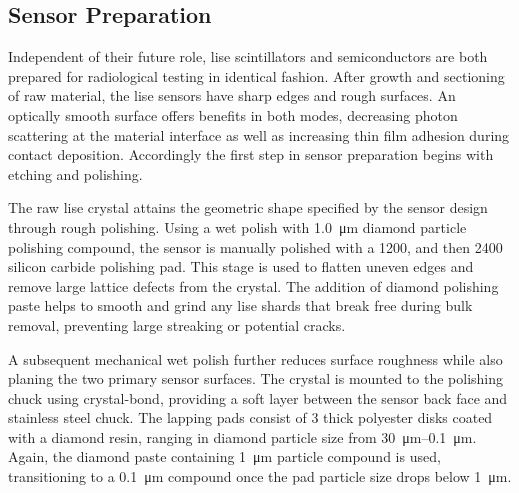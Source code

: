 \documentclass[../../../main.tex]{subfiles}
\begin{document}
%
    \subsection{Sensor Preparation}%
    \label{sec:chapter-3:sensor-fabrication:sensor-preparation}%
    Independent of their future role, \gls{lise} scintillators and semiconductors are both prepared for radiological testing in identical fashion.
    After growth and sectioning of raw material, the \gls{lise} sensors have sharp edges and rough surfaces.
    An optically smooth surface offers benefits in both modes, decreasing photon scattering at the material interface as well as increasing thin film adhesion during contact deposition.
    Accordingly the first step in sensor preparation begins with etching and polishing.
    \par%
    The raw \gls{lise} crystal attains the geometric shape specified by the sensor design through rough polishing.
    Using a wet polish with \SI{1.0}{\micro\meter} diamond particle polishing compound, the sensor is manually polished with a \SI{1200}{\grit}, and then \SI{2400}{\grit} silicon carbide polishing pad.
    This stage is used to flatten uneven edges and remove large lattice defects from the crystal.
    The addition of diamond polishing paste helps to smooth and grind any \gls{lise} shards that break free during bulk removal, preventing large streaking or potential cracks.
    \par%
    A subsequent mechanical wet polish further reduces surface roughness while also planing the two primary sensor surfaces.
    The crystal is mounted to the polishing chuck using \gls{crystal-bond}, providing a soft layer between the sensor back face and stainless steel chuck.
    The lapping pads consist of \SI{3}{\mil} thick polyester disks coated with a diamond resin, ranging in diamond particle size from \SIrange{30}{0.1}{\micro\meter}.
    Again, the diamond paste containing \SI{1}{\micro\meter} particle compound is used, transitioning to a \SI{0.1}{\micro\meter} compound once the pad particle size drops below \SI{1}{\micro\meter}.
\end{document}
